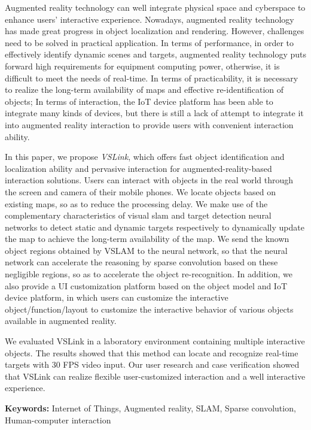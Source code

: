 Augmented reality technology can well integrate physical space and cyberspace to enhance users' interactive experience. Nowadays, augmented reality technology has made great progress in object localization and rendering. However, challenges need to be solved in practical application. In terms of performance, in order to effectively identify dynamic scenes and targets, augmented reality technology puts forward high requirements for equipment computing power, otherwise, it is difficult to meet the needs of real-time. In terms of practicability, it is necessary to realize the long-term availability of maps and effective re-identification of objects; In terms of interaction, the IoT device platform has been able to integrate many kinds of devices, but there is still a lack of attempt to integrate it into augmented reality interaction to provide users with convenient interaction ability.

In this paper, we propose \textit{VSLink}, which offers fast object identification and localization ability and pervasive interaction for augmented-reality-based interaction solutions. Users can interact with objects in the real world through the screen and camera of their mobile phones.
We locate objects based on existing maps, so as to reduce the processing delay. We make use of the complementary characteristics of visual slam and target detection neural networks to detect static and dynamic targets respectively to dynamically update the map to achieve the long-term availability of the map.
We send the known object regions obtained by VSLAM to the neural network, so that the neural network can accelerate the reasoning by sparse convolution based on these negligible regions, so as to accelerate the object re-recognition.
In addition, we also provide a UI customization platform based on the object model and IoT device platform, in which users can customize the interactive object/function/layout to customize the interactive behavior of various objects available in augmented reality.

We evaluated VSLink in a laboratory environment containing multiple interactive objects. The results showed that this method can locate and recognize real-time targets with 30 FPS video input. Our user research and case verification showed that VSLink can realize flexible user-customized interaction and a well interactive experience.

\noindent\textbf{Keywords:} Internet of Things, Augmented reality, SLAM, Sparse convolution, Human-computer interaction